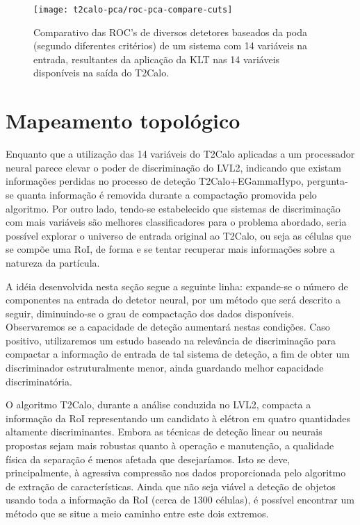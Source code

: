 \begin{figure}
\begin{center}
\texttt{[image: t2calo-pca/roc-pca-compare-cuts]}
\end{center}
\caption{Comparativo das ROC's de diversos detetores baseados da poda (segundo
diferentes critérios) de um sistema com 14 variáveis na entrada, resultantes
da aplicação da KLT nas 14 variáveis disponíveis na saída do T2Calo.}
\label{fig:roc-pca-compare-cuts}
\end{figure}

\section{Mapeamento topológico}

Enquanto que a utilização das 14 variáveis do T2Calo aplicadas a um
processador neural parece elevar o poder de discriminação do LVL2, indicando
que existam informações perdidas no processo de deteção T2Calo+EGammaHypo,
pergunta-se quanta informação é removida durante a compactação promovida pelo
algoritmo. Por outro lado, tendo-se estabelecido que sistemas de discriminação
com mais variáveis são melhores classificadores para o problema abordado,
seria possível explorar o universo de entrada original ao T2Calo, ou seja as
células que se compõe uma RoI, de forma e se tentar recuperar mais informações
sobre a natureza da partícula.

A idéia desenvolvida nesta seção segue a seguinte linha: expande-se o número
de componentes na entrada do detetor neural, por um método que será descrito a
seguir, diminuindo-se o grau de compactação dos dados
disponíveis. Observaremos se a capacidade de deteção aumentará nestas
condições. Caso positivo, utilizaremos um estudo baseado na relevância de 
discriminação para compactar a informação de entrada de tal sistema de
deteção, a fim de obter um discriminador estruturalmente menor, ainda
guardando melhor capacidade discriminatória.

O algoritmo T2Calo, durante a análise conduzida no LVL2, compacta a informação
da RoI representando um candidato à elétron em quatro quantidades altamente
discriminantes. Embora as técnicas de deteção linear ou neurais propostas sejam
mais robustas quanto à operação e manutenção, a qualidade física da separação
é menos afetada que desejaríamos. Isto se deve, principalmente, à agressiva
compressão nos dados proporcionada pelo algoritmo de extração de
características. Ainda que não seja viável a deteção de objetos usando toda a
informação da RoI (cerca de 1300 células), é possível encontrar um método que
se situe a meio caminho entre este dois extremos.

